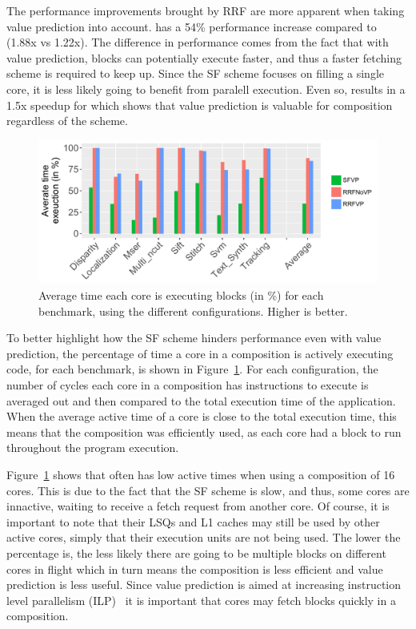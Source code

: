 The performance improvements brought by RRF are more apparent when taking value prediction into account.
\nfvp{} has a 54\% performance increase compared to \vp{} (1.88x vs 1.22x).
The difference in performance comes from the fact that with value prediction, blocks can potentially execute faster, and thus a faster fetching scheme is required to keep up.
Since the SF scheme focuses on filling a single core, it is less likely going to benefit from paralell execution.
Even so, \vp{} results in a 1.5x speedup for  which shows that value prediction is valuable for composition regardless of the scheme.

\begin{figure}[t]
    \centering
    \includegraphics[width=1\textwidth]{chapter3/graphics/perf_av_cycle_exec4.pdf}
    \caption{Average time each core is executing blocks (in \%) for each benchmark, using the different configurations. Higher is better.}
    \label{fig:perf_av_cycle}
	\vspace{1em}
\end{figure}

To better highlight how the SF scheme hinders performance even with value prediction, the percentage of time a core in a composition is actively executing code, for each benchmark, is shown in Figure~\ref{fig:perf_av_cycle}.
For each configuration, the number of cycles each core in a composition has instructions to execute is averaged out and then compared to the total execution time of the application.
When the average active time of a core is close to the total execution time, this means that the composition was efficiently used, as each core had a block to run throughout the program execution.

Figure~\ref{fig:perf_av_cycle} shows that \vp{} often has low active times when using a composition of 16 cores.
This is due to the fact that the SF scheme is slow, and thus, some cores are innactive, waiting to receive a fetch request from another core.
Of course, it is important to note that their LSQs and L1 caches may still be used by other active cores, simply that their execution units are not being used.
The lower the percentage is, the less likely there are going to be multiple blocks on different cores in flight which in turn means the composition is less efficient and value prediction is less useful.
Since value prediction is aimed at increasing instruction level parallelism (ILP)~\cite{peraisBeBop2015} it is important that cores may fetch blocks quickly in a composition.

